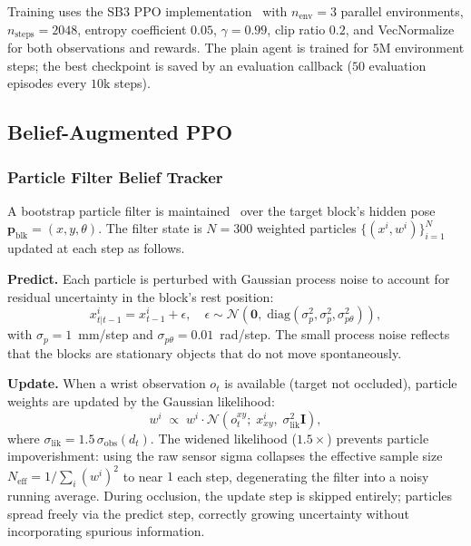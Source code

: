 \documentclass[conference]{IEEEtran}
\newcommand{\block}{\mathbf{p}_{\text{blk}}}
\newcommand{\sigmaobs}{\sigma_{\text{obs}}}
\begin{document}
Training uses the SB3 PPO implementation~\cite{raffin2021sb3} with
$n_{\text{env}} = 3$ parallel environments, $n_{\text{steps}} = 2048$,
entropy coefficient $0.05$, $\gamma = 0.99$, clip ratio $0.2$,
and VecNormalize for both observations and rewards.
The plain agent is trained for $5\text{M}$ environment steps; the best checkpoint
is saved by an evaluation callback ($50$ evaluation episodes every $10\text{k}$
steps).

\subsection{Belief-Augmented PPO}

\subsubsection{Particle Filter Belief Tracker}

A bootstrap particle filter is maintained~\cite{gordon1993novel} over the target
block's hidden pose $\block = (x, y, \theta)$.
The filter state is $N = 300$ weighted particles
$\{(x^i, w^i)\}_{i=1}^{N}$ updated at each step as follows.

\textbf{Predict.}
Each particle is perturbed with Gaussian process noise to account for residual
uncertainty in the block's rest position:
\begin{equation}
  x^i_{t|t-1} = x^i_{t-1} + \epsilon,\quad
  \epsilon \sim \mathcal{N}(\mathbf{0},\;\text{diag}(\sigma_p^2, \sigma_p^2, \sigma_{p\theta}^2)),
\end{equation}
with $\sigma_p = 1$~mm/step and $\sigma_{p\theta} = 0.01$~rad/step.
The small process noise reflects that the blocks are stationary objects
that do not move spontaneously.

\textbf{Update.}
When a wrist observation $o_t$ is available (target not occluded), particle
weights are updated by the Gaussian likelihood:
\begin{equation}
  w^i \;\propto\; w^i \cdot \mathcal{N}\!\left(o_t^{xy};\; x^i_{xy},\;
  \sigma_{\text{lik}}^2 \mathbf{I}\right),
  \label{eq:pf_update}
\end{equation}
where $\sigma_{\text{lik}} = 1.5\,\sigmaobs(d_t)$.
The widened likelihood ($1.5\times$) prevents particle impoverishment:
using the raw sensor sigma collapses the effective sample size $N_{\text{eff}}
= 1/\sum_i (w^i)^2$ to near $1$ each step, degenerating the filter into
a noisy running average.
During occlusion, the update step is skipped entirely; particles spread
freely via the predict step, correctly growing uncertainty without
incorporating spurious information.
\end{document}
